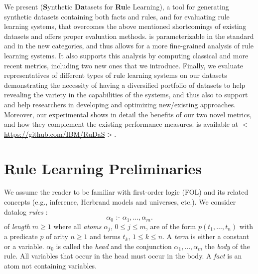 \documentclass[letterpaper]{article} \usepackage{aaai20}  \usepackage{times}  \usepackage{helvet} \usepackage{courier}  \usepackage[hyphens]{url}  \usepackage{graphicx} \urlstyle{rm} \def\UrlFont{\rm}  \usepackage{graphicx}  \frenchspacing  \setlength{\pdfpagewidth}{8.5in}  \setlength{\pdfpageheight}{11in}  \usepackage{amsthm}
\theoremstyle{definition}
\newcommand{\tool}{\text{RuDaS}\xspace}
\newcommand{\ass}{\text{ :- }}
\begin{document}
We present \tool (\textbf{S}ynthetic \textbf{Da}tasets for \textbf{Ru}le Learning), a tool for generating synthetic datasets containing both facts and rules, and for evaluating rule learning systems, that overcomes the above mentioned shortcomings of existing datasets and offers proper evaluation methods. 
\tool is parameterizable in the standard and in the new categories, and thus allows for a more fine-grained analysis of rule learning systems. It also supports this analysis by computing classical and more recent metrics, including two new ones that we introduce.
Finally, we evaluate representatives of different types of rule learning systems on our datasets demonstrating the necessity of having a diversified portfolio of datasets to help revealing the variety in the capabilities of the systems, and thus also to support and help researchers in developing and optimizing new/existing approaches.
Moreover, our experimental shows in detail the benefits of our two novel metrics, and how they complement the existing performance measures.
\tool is available at 
$<$\url{https://github.com/IBM/RuDaS}$>$.

\section{Rule Learning Preliminaries}\label{sec:motivation}

We assume the reader to be familiar with first-order logic (FOL) and its related concepts (e.g., inference, Herbrand models and universes, etc.).
We consider datalog \emph{rules} \cite{datalog}: \begin{equation}\label{eq:rule}
 \alpha_0\ass\alpha_1,\dots,\alpha_m .
\end{equation}
of \emph{length} $m\ge1$ where all \emph{atoms} $\alpha_j$, $0\le j\le m$, are of the form $p(t_1,\dots,t_n)$ with a {predicate} $p$ of arity $n\ge1$ and terms $t_k$, $1\le k\le n$.
A \emph{term} is either a constant or a variable. 
$\alpha_0$ is called the \emph{head} and the conjunction $\alpha_1,\dots,\alpha_m$ the \emph{body} of the rule. All variables that occur in the head must occur in the body. A \emph{fact} is an atom not containing variables.
\end{document}
